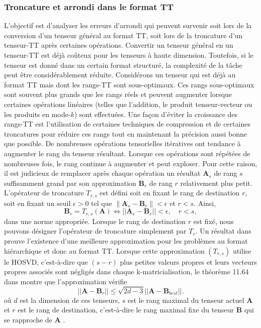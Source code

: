 \documentclass[11pt,a4paper,oneside]{book}
\newcommand{\mbf}[1]{\mathbf{#1}}
\begin{document}
\subsubsection{Troncature et arrondi dans le format TT}
L'objectif est d'analyser les erreurs d'arrondi qui peuvent survenir soit lors de la conversion d'un tenseur général au format TT, soit lors de la troncature d'un tenseur-TT après certaines opérations.
Convertir un tenseur général en un tenseur-TT est déjà coûteux pour les tenseurs à haute dimension. Toutefois, si le tenseur est donné dans un certain format structuré, la complexité de la tâche peut être considérablement réduite. Considérons un tenseur qui est déjà au format TT mais dont les rangs-TT sont sous-optimaux. Ces rangs sous-optimaux sont souvent plus grands que les rangs réels et peuvent augmenter lorsque certaines opérations linéaires (telles que l'addition, le produit tenseur-vecteur ou les produits en mode-$ k $) sont effectuées. Une façon d'éviter la croissance des rangs-TT est l'utilisation de certaines techniques de compression et de certaines troncatures pour réduire ces rangs tout en maintenant la précision aussi bonne que possible. De nombreuses opérations tensorielles itératives ont tendance à augmenter le rang du tenseur résultant. Lorsque ces opérations sont répétées de nombreuses fois, le rang continue à augmenter et peut exploser. Pour cette raison, il est judicieux de remplacer après chaque opération un résultat $ \mbf{A}_{s} $ de rang $ s $ suffisamment grand par son approximation $ \mbf{B}_{r} $ de rang $ r $ relativement plus petit.
L'opérateur de troncature $ T_{r,s} $ est défini soit en fixant le rang de destination $ r $, soit en fixant un seuil $ \epsilon> 0 $ tel que $ \parallel \mbf{A}_{s}-\mbf{B}_{r}\parallel<\epsilon $ et $ r < s $. Ainsi,
	\begin{equation}
\label{troncDef}
\mbf{B}_r=T_{r,s}(\mbf{A})\Leftrightarrow ||\mbf{A}_s-\mbf{B}_r||<\epsilon, \quad r < s, 
\end{equation}	
dans une norme appropriée. Lorsque le rang de destination $ r $ est fixé, nous pouvons désigner l'opérateur de troncature simplement par $ T_{r} $. Un résultat dans \cite[p.354, Théorème 11.56]{hackbusch2012tensor} prouve l'existence d'une meilleure approximation pour les problèmes au format hiérarchique et donc au format TT. Lorsque cette approximation $ (T_{r,s}) $ utilise le HOSVD, c'est-à-dire que $ (s-r) $ plus petites valeurs propres et leurs vecteurs propres associés sont négligés dans chaque k-matricialisation, le théorème 11.64 dans \cite[p.362]{hackbusch2012tensor} montre que l'approximation vérifie
	\begin{equation}
	\label{troncApprox}
	||\mbf{A}-\mbf{B}_r||\leq \sqrt{2d-3}||\mbf{A}-\mbf{B}_{best}||.
	\end{equation}
	où $ d $ est la dimension de ces tenseurs, $ s $ est le rang maximal du tenseur actuel $ \mbf{A} $ et $ r $ est le rang de destination, c'est-à-dire le rang maximal fixe du tenseur $ \mbf{B} $ qui se rapproche de $ \mbf{A} $ \cite[p.151]{Nyenyezi2018}.
	
\end{document}
